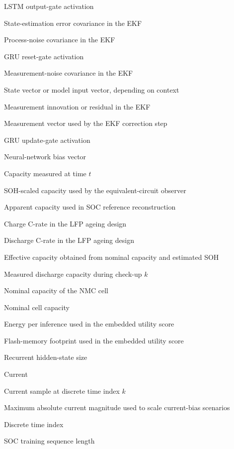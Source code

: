 \documentclass[
    a4paper,
    12pt,
    titlepage,
    bibliography=totoc,
    twoside=on,
    parskip=false,
    numbers=noenddot,
    cleardoublepage=empty,
    DIV=12,
    BCOR=12.0mm,
    headheight=36pt,
    headings=openright
]{scrreprt}
\begin{document}
\begin{description}[style=nextline,leftmargin=3.2cm]
\item[$\mathbf{o}_t$] LSTM output-gate activation
\item[$\mathbf{P}_k$] State-estimation error covariance in the EKF
\item[$\mathbf{Q}_k$] Process-noise covariance in the EKF
\item[$\mathbf{r}_t$] GRU reset-gate activation
\item[$\mathbf{R}_k$] Measurement-noise covariance in the EKF
\item[$\mathbf{x}$] State vector or model input vector, depending on context
\item[$\tilde{\mathbf{y}}_k$] Measurement innovation or residual in the EKF
\item[$\mathbf{z}_k$] Measurement vector used by the EKF correction step
\item[$\mathbf{z}_t$] GRU update-gate activation
\item[$b$] Neural-network bias vector
\item[$C(t)$] Capacity measured at time $t$
\item[$C_b$] SOH-scaled capacity used by the equivalent-circuit observer
\item[$C_\mathrm{app}$] Apparent capacity used in SOC reference reconstruction
\item[$C_\mathrm{chg}$] Charge C-rate in the LFP ageing design
\item[$C_\mathrm{dis}$] Discharge C-rate in the LFP ageing design
\item[$C_\mathrm{eff}$] Effective capacity obtained from nominal capacity and estimated SOH
\item[$C_k$] Measured discharge capacity during check-up $k$
\item[$C_\mathrm{N}$] Nominal capacity of the NMC cell
\item[$C_\mathrm{nom}$] Nominal cell capacity
\item[$E$] Energy per inference used in the embedded utility score
\item[$F$] Flash-memory footprint used in the embedded utility score
\item[$H$] Recurrent hidden-state size
\item[$I$] Current
\item[$I_k$] Current sample at discrete time index $k$
\item[$|I|_{\max}$] Maximum absolute current magnitude used to scale current-bias scenarios
\item[$k$] Discrete time index
\item[$L_\mathrm{SOC}$] SOC training sequence length

\end{description}
\end{document}
